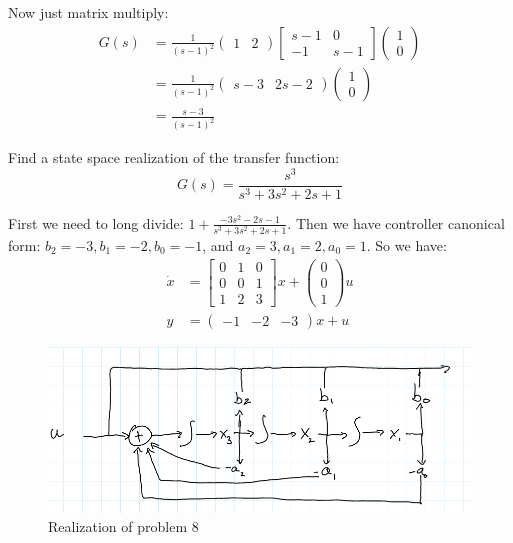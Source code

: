 \documentclass[11pt]{article}
\begin{document}
Now just matrix multiply:
\begin{align*}
    G(s) &= \frac{1}{(s-1)^2}\begin{pmatrix}
        1 & 2\end{pmatrix} 
        \begin{bmatrix}
        s-1 & 0\\-1 & s-1
        \end{bmatrix} \begin{pmatrix}
        1\\0
        \end{pmatrix}\\
        &= \frac{1}{(s-1)^2}\begin{pmatrix}
            s-3 & 2s-2
        \end{pmatrix} \begin{pmatrix}
            1\\0
        \end{pmatrix}\\
        &= \frac{s-3}{(s-1)^2}
\end{align*}



Find a state space realization of the transfer function:
$$
G(s) = \frac{s^3}{s^3 + 3s^2 + 2s + 1}
$$
\soln

First we need to long divide:
$1 + \frac{-3s^2 -2s -1}{s^3 + 3s^2 + 2s + 1}$.
Then we have controller canonical form:
$b_2=-3, b_1=-2, b_0=-1$, and $a_2 = 3, a_1 = 2, a_0 = 1$.
So we have:
\begin{align}
    \dot{x} &= \begin{bmatrix}
        0 & 1 & 0\\
        0 & 0 & 1\\
        1 & 2 & 3
    \end{bmatrix} x + \begin{pmatrix}
        0\\0\\1
    \end{pmatrix}u \\
    y &= \begin{pmatrix}
        -1 & -2 & -3
    \end{pmatrix}x + u
\end{align}

\begin{figure}[h] 
    \centering
    \includegraphics[width=0.55 \linewidth]{11-08-realization.png}
    \caption{Realization of problem 8}
    \label{fig:}
\end{figure}
\end{document}
